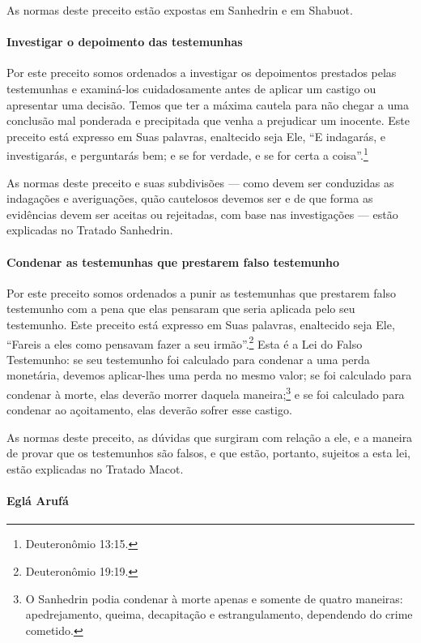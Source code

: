 As normas deste preceito estão expostas em Sanhedrin e em Shabuot.

\paragraph{Investigar o depoimento das testemunhas}

Por este preceito somos ordenados a investigar os depoimentos prestados
pelas testemunhas e examiná-los cuidadosamente antes de aplicar um
castigo ou apresentar uma decisão. Temos que ter a máxima cautela para
não chegar a uma conclusão mal ponderada e precipitada que venha a
prejudicar um inocente. Este preceito está expresso em Suas palavras,
enaltecido seja Ele, ``E indagarás, e investigarás, e perguntarás bem; e
se for verdade, e se for certa a coisa''.\footnote{Deuteronômio 13:15.}

As normas deste preceito e suas subdivisões --- como devem ser
conduzidas as indagações e averiguações, quão cautelosos devemos ser e
de que forma as evidências devem ser aceitas ou rejeitadas, com base nas
investigações --- estão explicadas no Tratado Sanhedrin.

\paragraph{Condenar as testemunhas que prestarem falso testemunho}

Por este preceito somos ordenados a punir as testemunhas que prestarem
falso testemunho com a pena que elas pensaram que seria aplicada pelo
seu testemunho. Este preceito está expresso em Suas palavras, enaltecido
seja Ele, ``Fareis a eles como pensavam fazer a seu irmão''.\footnote{Deuteronômio 19:19.} Esta é a Lei do Falso Testemunho: se seu
testemunho foi calculado para condenar a uma perda monetária, devemos aplicar-lhes uma perda no mesmo valor;
se foi calculado para condenar à morte, elas deverão morrer daquela
maneira;\footnote{O Sanhedrin podia condenar à morte apenas e somente de quatro
maneiras: apedrejamento, queima, decapitação e estrangulamento,
dependendo do crime cometido.}
e se foi calculado para condenar ao açoitamento, elas deverão sofrer
esse castigo.

As normas deste preceito, as dúvidas que surgiram com relação a ele, e a
maneira de provar que os testemunhos são falsos, e que estão, portanto,
sujeitos a esta lei, estão explicadas no Tratado Macot.


\paragraph{Eglá Arufá}

